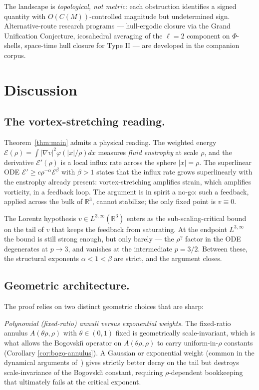 \documentclass[11pt]{amsart}
\theoremstyle{definition}
\newcommand{\RR}{\mathbb{R}}
\newcommand{\EE}{\mathcal{E}}    %
\newcommand{\Lweak}[1]{L^{3,\infty}(\RR^{#1})}
\newcommand{\abs}[1]{|#1|}
\begin{document}
The landscape is \emph{topological, not metric}: each obstruction
identifies a signed quantity with $O(C(M))$-controlled magnitude
but undetermined sign. Alternative-route research programs ---
hull-ergodic closure via the Grand Unification Conjecture,
icosahedral averaging of the $\ell = 2$ component on
$\Phi$-shells, space-time hull closure for Type II --- are
developed in the companion corpus.

\section{Discussion}\label{sec:discussion}

\subsection{The vortex-stretching reading.}

Theorem~\ref{thm:main} admits a physical reading. The weighted
energy $\EE(\rho) = \int \abs{\nabla v}^2 \varphi(\abs{x}/\rho)
dx$ measures \emph{fluid enstrophy} at scale $\rho$, and the
derivative $\EE'(\rho)$ is a local influx rate across the sphere
$\abs{x} = \rho$. The superlinear ODE
$\EE' \geq c\rho^{-\alpha}\EE^\beta$ with $\beta > 1$ states that
the influx rate grows superlinearly with the enstrophy already
present: vortex-stretching amplifies strain, which amplifies
vorticity, in a feedback loop. The argument is in spirit a
no-go: such a feedback, applied across the bulk of $\RR^3$,
cannot stabilize; the only fixed point is $v \equiv 0$.

The Lorentz hypothesis $v \in \Lweak{3}$ enters as the
sub-scaling-critical bound on the tail of $v$ that keeps the
feedback from saturating. At the endpoint $L^{3,\infty}$ the
bound is still strong enough, but only barely --- the $\rho^\gamma$
factor in the ODE degenerates at $p \to 3$, and vanishes at the
intermediate $p = 3/2$. Between these, the structural exponents
$\alpha < 1 < \beta$ are strict, and the argument closes.

\subsection{Geometric architecture.}

The proof relies on two distinct geometric choices that are
sharp:

\emph{Polynomial (fixed-ratio) annuli versus exponential weights.}
The fixed-ratio annulus $A(\theta\rho, \rho)$ with $\theta \in
(0, 1)$ fixed is geometrically scale-invariant, which is what
allows the Bogovski\u{\i} operator on $A(\theta\rho, \rho)$ to
carry uniform-in-$\rho$ constants (Corollary
\ref{cor:bogo-annulus}). A Gaussian or exponential weight
(common in the dynamical arguments of~\cite{KNSS, ESS03RMS})
gives strictly better decay on the tail but destroys
scale-invariance of the Bogovski\u{\i} constant, requiring
$\rho$-dependent bookkeeping that ultimately fails at the
critical exponent.
\end{document}
